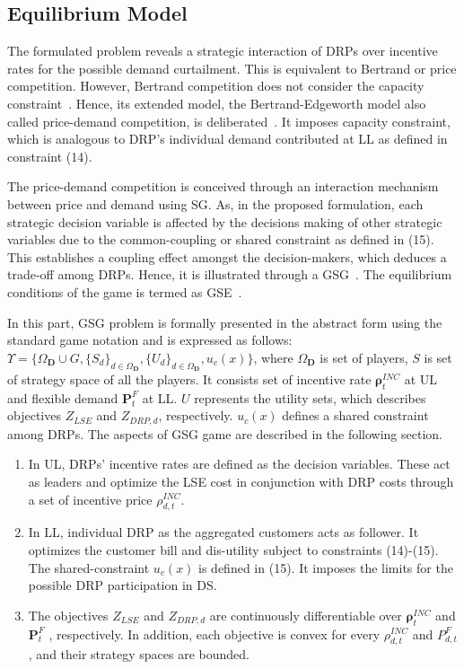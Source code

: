 \documentclass[journal]{IEEEtran}
\begin{document}
\subsection{Equilibrium Model }
The formulated problem reveals a strategic interaction of DRPs over incentive rates for the possible demand curtailment. This is equivalent to Bertrand or price competition. However, Bertrand competition does not consider the capacity constraint~\cite{allen1986bertrand}. Hence, its extended model, the Bertrand-Edgeworth model also called price-demand competition, is deliberated~\cite{maskin1986existence}. It imposes capacity constraint, which is analogous to DRP's individual demand contributed at LL as defined in constraint (14).

The price-demand competition is conceived through an interaction mechanism between price and demand using SG. As, in the proposed formulation, each strategic decision variable is affected by the decisions making of other strategic variables due to the common-coupling or shared constraint as defined in (15). This establishes a coupling effect amongst the decision-makers, which deduces a trade-off among DRPs. Hence, it is illustrated through a GSG~\cite{su2004sequential,leyffer2010solving,pang2005quasi}. The equilibrium conditions of the game is termed as GSE~\cite{pang2005quasi}.

In this part, GSG problem is formally presented in the abstract form using the standard game notation and is expressed as follows: $\Upsilon  = \{ {\Omega _\textbf{D}} \cup G,{\{ {S_d}\} _{d \in {\Omega _\textbf{D}}}},{\{ {U_d}\} _{d \in {\Omega _\textbf{D}}}},u_{c}(x)\}$, where ${\Omega _\textbf{D}}$ is set of players, $S$ is set of strategy space of all the players. It consists set of incentive rate $\boldsymbol{\rho}_t^{INC}$ at UL and flexible demand $\boldsymbol{P}_t^F$  at LL. $U$  represents the utility sets, which describes objectives $Z_{LSE}$ and $Z_{DRP,d}$, respectively. $u_{c}(x)$  defines a shared constraint among DRPs. The aspects of GSG game are described in the following section.
\begin{enumerate}[label=(\roman*)]
	\item 	In UL, DRPs' incentive rates are defined as the decision variables. These act as leaders and optimize the LSE cost in conjunction with DRP costs through a set of incentive price $\rho _{d,t}^{INC}$. 
	\item In LL, individual DRP as the aggregated customers acts as follower. It optimizes the customer bill and dis-utility subject to constraints (14)-(15). The shared-constraint $u_{c}(x)$ is defined in (15). It imposes the limits for the possible DRP participation in DS. 
	\item The objectives $Z_{LSE}$ and $Z_{DRP,d}$ are continuously differentiable over $\boldsymbol{\rho} _t^{INC}$   and $\boldsymbol{P} _t^{F}$ , respectively.  In addition, each objective is convex for every   $\rho _{d,t}^{INC}$ and $P_{d,t}^{F}$, and their strategy spaces are bounded. 
\end{enumerate}
\end{document}
